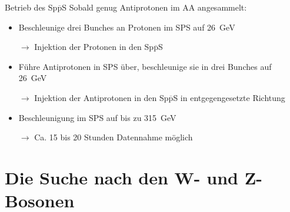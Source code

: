 \documentclass[aspectratio=1610, professionalfonts, 10pt]{beamer}
\begin{document}
\begin{frame}{Betrieb des Sp$\overline{\text{p}}$S}
				Sobald genug Antiprotonen im AA angesammelt:
				\begin{itemize}
					\setlength\itemsep{0.5em}
					\item Beschleunige drei Bunches an Protonen im SPS auf \SI{26}{\giga\electronvolt}
					\item[$\rightarrow$] Injektion der Protonen in den Sp$\overline{\text{p}}$S
					\item Führe Antiprotonen in SPS über, beschleunige sie in drei Bunches auf \SI{26}{\giga\electronvolt}
					\item[$\rightarrow$] Injektion der Antiprotonen in den Sp$\overline{\text{p}}$S in entgegengesetzte Richtung
					\item Beschleunigung im SPS auf bis zu \SI{315}{\giga\electronvolt}
					\item[$\rightarrow$] Ca. 15 bis 20 Stunden Datennahme möglich
				\end{itemize}

\end{frame}

\section{Die Suche nach den W- und Z-Bosonen}
\end{document}
